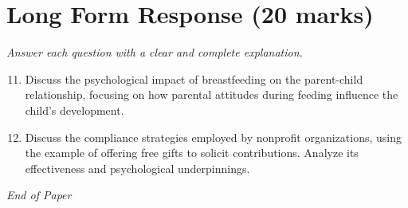 \documentclass[12pt]{article}
\begin{document}
\section*{Long Form Response (20 marks)}
\textit{Answer each question with a clear and complete explanation.}
\begin{enumerate}[label=\arabic*.]
\setcounter{enumi}{10}
\item Discuss the psychological impact of breastfeeding on the parent-child relationship, focusing on how parental attitudes during feeding influence the child's development.
\item Discuss the compliance strategies employed by nonprofit organizations, using the example of offering free gifts to solicit contributions. Analyze its effectiveness and psychological underpinnings.
\end{enumerate}

\vfill
\noindent\textit{End of Paper}
\end{document}
